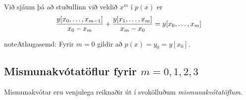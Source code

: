 \documentclass[letterpaper,10pt,icelandic]{sphinxmanual}
\begin{document}
Við sjáum þá að stuðullinn við veldið \(x^m\) í \(p(x)\) er
\begin{gather}
\begin{split}\frac{y[x_0, \ldots, x_{m-1}]}{x_0-x_m} +
  \frac{y[x_1, \ldots, x_m]}{x_m - x_0}
  = y[x_0, \ldots, x_m]\end{split}\notag
\end{gather}
\begin{notice}{note}{Athugasemd:}
Fyrir \(m=0\) gildir að \(p(x) = y_0 = y[x_0]\).
\end{notice}


\subsection{Mismunakvótatöflur fyrir \(m=0,1,2,3\)}
\label{kafli03:mismunakvotatoflur-fyrir}\label{kafli03:index-10}
Mismunakvótar eru venjulega reiknaðir út í svokölluðum
\emph{mismunakvótatöflum}.
\end{document}
